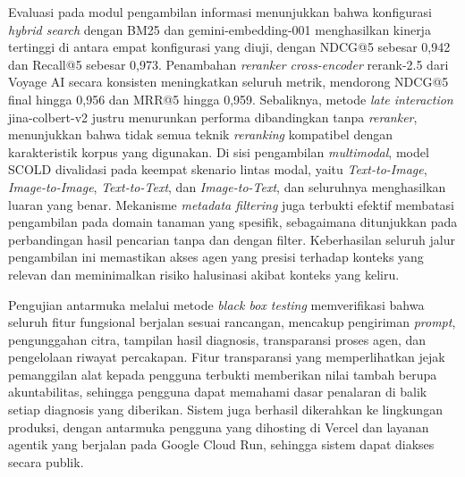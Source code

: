 Evaluasi pada modul pengambilan informasi menunjukkan bahwa konfigurasi \textit{hybrid search} dengan BM25 dan gemini-embedding-001 menghasilkan kinerja tertinggi di antara empat konfigurasi yang diuji, dengan NDCG@5 sebesar 0,942 dan Recall@5 sebesar 0,973. Penambahan \textit{reranker cross-encoder} rerank-2.5 dari Voyage AI secara konsisten meningkatkan seluruh metrik, mendorong NDCG@5 final hingga 0,956 dan MRR@5 hingga 0,959. Sebaliknya, metode \textit{late interaction} jina-colbert-v2 justru menurunkan performa dibandingkan tanpa \textit{reranker}, menunjukkan bahwa tidak semua teknik \textit{reranking} kompatibel dengan karakteristik korpus yang digunakan. Di sisi pengambilan \textit{multimodal}, model SCOLD divalidasi pada keempat skenario lintas modal, yaitu \textit{Text-to-Image}, \textit{Image-to-Image}, \textit{Text-to-Text}, dan \textit{Image-to-Text}, dan seluruhnya menghasilkan luaran yang benar. Mekanisme \textit{metadata filtering} juga terbukti efektif membatasi pengambilan pada domain tanaman yang spesifik, sebagaimana ditunjukkan pada perbandingan hasil pencarian tanpa dan dengan filter. Keberhasilan seluruh jalur pengambilan ini memastikan akses agen yang presisi terhadap konteks yang relevan dan meminimalkan risiko halusinasi akibat konteks yang keliru.

Pengujian antarmuka melalui metode \textit{black box testing} memverifikasi bahwa seluruh fitur fungsional berjalan sesuai rancangan, mencakup pengiriman \textit{prompt}, pengunggahan citra, tampilan hasil diagnosis, transparansi proses agen, dan pengelolaan riwayat percakapan. Fitur transparansi yang memperlihatkan jejak pemanggilan alat kepada pengguna terbukti memberikan nilai tambah berupa akuntabilitas, sehingga pengguna dapat memahami dasar penalaran di balik setiap diagnosis yang diberikan. Sistem juga berhasil dikerahkan ke lingkungan produksi, dengan antarmuka pengguna yang dihosting di Vercel dan layanan agentik yang berjalan pada Google Cloud Run, sehingga sistem dapat diakses secara publik.

